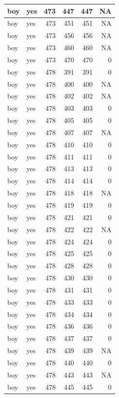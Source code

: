 \documentclass[man]{apa6}
\begin{document}
\begin{tabular}{l|l|r|r|r|r}
\hline
boy & yes & 473 & 447 & 447 & NA\\
\hline
boy & yes & 473 & 451 & 451 & NA\\
\hline
boy & yes & 473 & 456 & 456 & NA\\
\hline
boy & yes & 473 & 460 & 460 & NA\\
\hline
boy & yes & 473 & 470 & 470 & 0\\
\hline
boy & yes & 478 & 391 & 391 & 0\\
\hline
boy & yes & 478 & 400 & 400 & NA\\
\hline
boy & yes & 478 & 402 & 402 & NA\\
\hline
boy & yes & 478 & 403 & 403 & 0\\
\hline
boy & yes & 478 & 405 & 405 & 0\\
\hline
boy & yes & 478 & 407 & 407 & NA\\
\hline
boy & yes & 478 & 410 & 410 & 0\\
\hline
boy & yes & 478 & 411 & 411 & 0\\
\hline
boy & yes & 478 & 413 & 413 & 0\\
\hline
boy & yes & 478 & 414 & 414 & 0\\
\hline
boy & yes & 478 & 418 & 418 & NA\\
\hline
boy & yes & 478 & 419 & 419 & 0\\
\hline
boy & yes & 478 & 421 & 421 & 0\\
\hline
boy & yes & 478 & 422 & 422 & NA\\
\hline
boy & yes & 478 & 424 & 424 & 0\\
\hline
boy & yes & 478 & 425 & 425 & 0\\
\hline
boy & yes & 478 & 428 & 428 & 0\\
\hline
boy & yes & 478 & 430 & 430 & 0\\
\hline
boy & yes & 478 & 431 & 431 & 0\\
\hline
boy & yes & 478 & 433 & 433 & 0\\
\hline
boy & yes & 478 & 434 & 434 & 0\\
\hline
boy & yes & 478 & 436 & 436 & 0\\
\hline
boy & yes & 478 & 437 & 437 & 0\\
\hline
boy & yes & 478 & 439 & 439 & NA\\
\hline
boy & yes & 478 & 440 & 440 & 0\\
\hline
boy & yes & 478 & 443 & 443 & NA\\
\hline
boy & yes & 478 & 445 & 445 & 0\\

\end{tabular}
\end{document}
